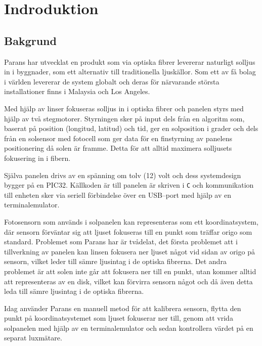 \section{Indroduktion} %
\label{sec:indroduktion}

    \subsection{Bakgrund} %
    \label{sub:bakgrund}
        Parans har utvecklat en produkt som via optiska fibrer levererar naturligt solljus in i byggnader, som ett alternativ till traditionella ljuskällor. 
        Som ett av få bolag i världen levererar de system globalt och deras för närvarande största installationer finns i Malaysia och Los Angeles. \bigskip

        Med hjälp av linser fokuseras solljus in i optiska fibrer och panelen styrs med hjälp av två stegmotorer. 
        Styrningen sker på input dels från en algoritm som, baserat på position (longitud, latitud) och tid, ger en solposition i grader och dels från en solsensor med fotocell som ger data för en finstyrning av panelens positionering då solen är framme.
        Detta för att alltid maximera solljusets fokusering in i fibern.\bigskip

        Själva panelen drivs av en spänning om tolv (12) volt och dess systemdesign bygger på en PIC32. 
        Källkoden är till panelen är skriven i \texttt{C} och kommunikation till enheten sker via seriell förbindelse över en USB–port med hjälp av en terminalemulator. \bigskip

        Fotosensorn som används i solpanelen kan representeras som ett koordinatsystem, där sensorn förväntar sig att ljuset fokuseras till en punkt som träffar origo som standard. 
        Problemet som Parans har är tvådelat, det första problemet att i tillverkning av panelen kan linsen fokusera ner ljuset något vid sidan av origo på sensorn, vilket leder till sämre ljusintag i de optiska fibrerna. 
        Det andra problemet är att solen inte går att fokusera ner till en punkt, utan kommer alltid att representeras av en disk, vilket kan förvirra sensorn något och då även detta leda till sämre ljusintag i de optiska fibrerna. \bigskip

        Idag använder Parans en manuell metod för att kalibrera sensorn, flytta den punkt på koordinatsystemet som ljuset fokuserar ner till, genom att vrida solpanelen med hjälp av en terminalemulator och sedan kontrollera värdet på en separat luxmätare.

